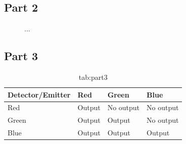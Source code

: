\subsection{Part 2}

\begin{figure}[H]
    \centering
    \hfill
    \caption{...}
    \label{fig:part2}
\end{figure}

\subsection{Part 3}

\begin{table}[H]
    \centering
    \begin{tabular}{@{}llll@{}}
    \toprule
    Detector/Emitter & Red    & Green     & Blue      \\ \midrule
    Red              & Output & No output & No output \\
    Green            & Output & Output    & No output \\
    Blue             & Output & Output    & Output    \\ \bottomrule
    \end{tabular}
    \caption{tab:part3}
\end{table}